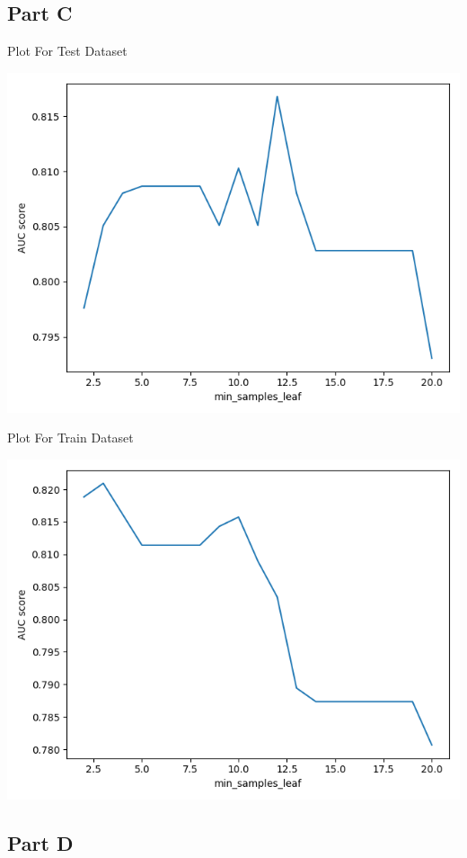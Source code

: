 \documentclass[12pt]{article}
\begin{document}
    \subsection{Part C}\label{subsec:part-c2}
    \begin{center}
                Plot For Test Dataset
    \end{center}
    \includegraphics[scale=0.8]{../Plot/plot_test.png}
     \begin{center}
                Plot For Train Dataset
    \end{center}
    \includegraphics[scale=0.8]{../Plot/plot_train.png}
    \subsection{Part D}\label{subsec:part-d}
\end{document}
